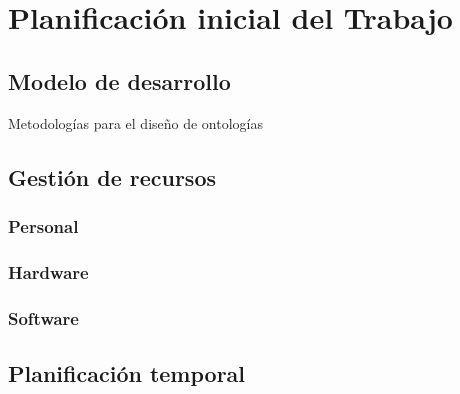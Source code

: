 \chapter{Planificación inicial del Trabajo}

\section{Modelo de desarrollo}

Metodologías para el diseño de ontologías

\section{Gestión de recursos}

\subsection{Personal}

\subsection{Hardware}

\subsection{Software}

\section{Planificación temporal}